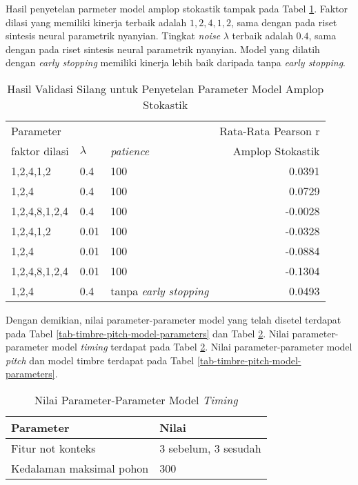 Hasil penyetelan parmeter model amplop stokastik tampak pada Tabel \ref{tab-stoc-model-tuning-results}. Faktor dilasi yang memiliki kinerja terbaik adalah $1,2,4,1,2$, sama dengan pada riset sintesis neural parametrik nyanyian. Tingkat \textit{noise} $\lambda$ terbaik adalah $0.4$, sama dengan pada riset sintesis neural parametrik nyanyian. Model yang dilatih dengan \textit{early stopping} memiliki kinerja lebih baik daripada tanpa \textit{early stopping}.

\begin{table}[htbp]
    \centering
    \caption{Hasil Validasi Silang untuk Penyetelan Parameter Model Amplop Stokastik}\label{tab-stoc-model-tuning-results}
    \begin{tabular}{ |l|l|l|r| } 
     \hline
     \multicolumn{3}{|l|}{Parameter} & Rata-Rata Pearson r\\
     \cline{1-3}
     faktor dilasi & $\lambda$ & \textit{patience} & Amplop Stokastik\\
	 \hline 
	1,2,4,1,2& 0.4& 100           & 0.0391\\\hline
	1,2,4& 0.4& 100               & 0.0729\\\hline
	1,2,4,8,1,2,4& 0.4& 100       &-0.0028\\\hline
	1,2,4,1,2& 0.01& 100          &-0.0328\\\hline
	1,2,4& 0.01& 100              &-0.0884\\\hline
	1,2,4,8,1,2,4& 0.01& 100      &-0.1304\\\hline
	1,2,4& 0.4& tanpa \textit{early stopping}       & 0.0493\\\hline
    \end{tabular}
\end{table}

Dengan demikian, nilai parameter-parameter model yang telah disetel terdapat pada Tabel \ref{tab-timbre-pitch-model-parameters} dan Tabel \ref{tab-timing-model-parameters}. Nilai parameter-parameter model \textit{timing} terdapat pada Tabel \ref{tab-timing-model-parameters}. Nilai parameter-parameter model \textit{pitch} dan model timbre terdapat pada Tabel \ref{tab-timbre-pitch-model-parameters}.
\begin{table}[htbp]
	\centering
	\caption{Nilai Parameter-Parameter Model \textit{Timing}}\label{tab-timing-model-parameters}
	\begin{tabular}{|l|l|}
	\hline
	Parameter&Nilai \\\hline
	Fitur not konteks & 3 sebelum, 3 sesudah\\\hline
	Kedalaman maksimal pohon & 300\\\hline
	\end{tabular}
\end{table}


